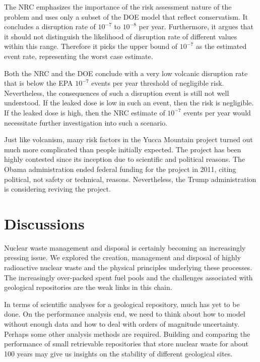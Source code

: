 \documentclass[nofootinbib,preprint,aps]{revtex4-1}
\begin{document}
        The NRC emphasizes the importance of the risk assessment nature of the problem and uses only a subset
        of the DOE model that reflect conservatism. It concludes a disruption rate of
        $10^{-7}$ to $10^{-8}$ per year. Furthermore, it argues that it should not distinguish the likelihood
        of disruption rate of different values within this range. Therefore it picks the upper bound
        of $10^{-7}$ as the estimated event rate, representing the worst case estimate.

        Both the NRC and the DOE conclude with a very low volcanic disruption rate that is below the EPA
        $10^{-7}$ events per year threshold of negligible risk.
        Nevertheless, the consequences of such a disruption event is still not well understood.
        If the leaked dose is low in such an event, then the risk is negligible. If the leaked dose is high,
        then the NRC estimate of $10^{-7}$ events per year would necessitate further investigation into such
        a scenario.\cite{cv14}

        Just like volcanism, many risk factors in the  Yucca Mountain project turned out much more complicated
        than people initially expected. The project has been highly contested since its
        inception due to scientific and political reasons. The Obama administration ended federal funding for the project in 2011, citing political,
        not safety or technical, reasons.\cite{m14} Nevertheless, the Trump administration is considering
        reviving the project.\cite{z17}
        
\section{Discussions}
Nuclear waste management and disposal is certainly becoming an increasingly pressing issue.
We explored the creation, management and disposal of highly radioactive nuclear waste and the physical
principles underlying these processes. The increasingly over-packed spent fuel pools and the challenges
associated with geological repositories are the weak links in this chain.

In terms of scientific analyses for a geological repository, much has yet to be done.
On the performance analysis end, we need
to think about how to model without enough data and how to deal with orders of magnitude uncertainty.
Perhaps some other analysis methods are required. Building and comparing the performance of 
small retrievable repositories that store
nuclear waste for about 100 years may give us insights on the stability of different geological sites.
\end{document}

